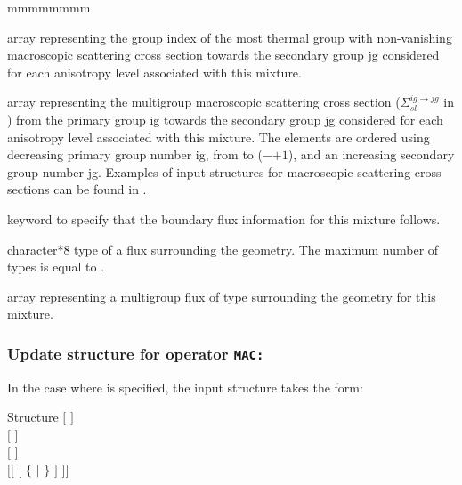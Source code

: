 \begin{ListeDeDescription}{mmmmmmmm}
\item[\dusa{ilastg}] array representing the group index of the most thermal
group with non-vanishing macroscopic scattering cross section towards the
secondary group jg considered for each anisotropy level associated with this
mixture.

\item[\dusa{xsscat}] array representing the multigroup macroscopic scattering
cross section ($\Sigma_{sl}^{ig\to jg}$ in \xsunit) from the primary group ig
towards the secondary group jg considered for each anisotropy level associated
with this mixture. The elements are ordered using decreasing primary group
number ig, from  to ($-$$+1$), and an
increasing secondary group number jg. Examples of input structures for 
macroscopic scattering cross sections can be
found in .

\item[\moc{ADF}] keyword to specify that the boundary flux information for this mixture follows.

\item[\dusa{hadf}] character*8 type of a flux surrounding the geometry. The maximum number of types is equal to .

\item[\dusa{xadf}] array representing a multigroup flux of type  surrounding the geometry for this
mixture. 

\end{ListeDeDescription}

\subsubsection{Update structure for operator {\tt MAC:}}\label{sect:descmacupd}
 
In the case where  is specified, the  input structure takes
the form:

\begin{DataStructure}{Structure }
$[$   $]$ \\
$[$   $]$ \\
$[$   $]$ \\
$[[$   $[$  $\{$  $|$  $\}$ $]$ $]]$
\end{DataStructure}

